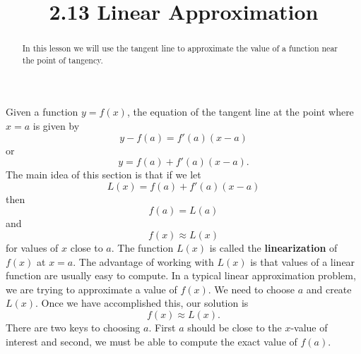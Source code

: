 \documentclass[handout]{ximera}
\title{2.13 Linear Approximation}
\begin{document}
\begin{abstract}
In this lesson we will use the tangent line to approximate the value of a 
function near the point of tangency.
\end{abstract}

\maketitle


Given a function $y=f(x)$, the equation of the tangent line
at the point where $x = a$ is given by
\[y-f(a) = f'(a)(x - a)\]
or
\[y = f(a) + f'(a)(x - a).\]
The main idea of this section is that if we let 
\[L(x) = f(a) + f'(a)(x - a)\] then 
\[f(a) = L(a)\]
and
\[f(x) \approx L(x)\]
for values of $x$ close to $a$. The function $L(x)$ is called the \textbf{linearization} of $f(x)$ at $x = a$. 
The advantage of working with $L(x)$ is that values of a linear 
function are usually easy to compute.
In a typical linear approximation problem, we are trying to approximate a value of $f(x)$. We need to choose $a$ and create
$L(x)$. Once we have accomplished this, our solution is 
\[f(x) \approx L(x).\]
There are two keys to choosing $a$. First $a$ should be close to the $x$-value of interest and second, 
we must be able to compute the exact value of $f(a)$.



\begin{image}
\end{image}
\end{document}
